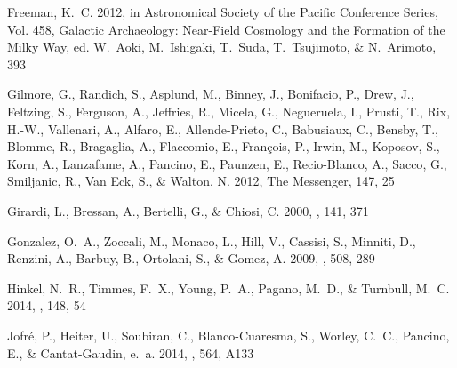 \documentclass[12pt, preprint]{aastex}
\begin{document}
\begin{thebibliography}{24}
{Freeman}, K.~C. 2012, in Astronomical Society of the Pacific Conference
  Series, Vol. 458, Galactic Archaeology: Near-Field Cosmology and the
  Formation of the Milky Way, ed. W.~{Aoki}, M.~{Ishigaki}, T.~{Suda},
  T.~{Tsujimoto}, \& N.~{Arimoto}, 393

{Gilmore}, G., {Randich}, S., {Asplund}, M., {Binney}, J., {Bonifacio}, P.,
  {Drew}, J., {Feltzing}, S., {Ferguson}, A., {Jeffries}, R., {Micela}, G.,
  {Negueruela}, I., {Prusti}, T., {Rix}, H.-W., {Vallenari}, A., {Alfaro}, E.,
  {Allende-Prieto}, C., {Babusiaux}, C., {Bensby}, T., {Blomme}, R.,
  {Bragaglia}, A., {Flaccomio}, E., {Fran{\c c}ois}, P., {Irwin}, M.,
  {Koposov}, S., {Korn}, A., {Lanzafame}, A., {Pancino}, E., {Paunzen}, E.,
  {Recio-Blanco}, A., {Sacco}, G., {Smiljanic}, R., {Van Eck}, S., \& {Walton},
  N. 2012, The Messenger, 147, 25

{Girardi}, L., {Bressan}, A., {Bertelli}, G., \& {Chiosi}, C. 2000, \aaps, 141,
  371

{Gonzalez}, O.~A., {Zoccali}, M., {Monaco}, L., {Hill}, V., {Cassisi}, S.,
  {Minniti}, D., {Renzini}, A., {Barbuy}, B., {Ortolani}, S., \& {Gomez}, A.
  2009, \aap, 508, 289

{Hinkel}, N.~R., {Timmes}, F.~X., {Young}, P.~A., {Pagano}, M.~D., \&
  {Turnbull}, M.~C. 2014, \aj, 148, 54

{Jofr{\'e}}, P., {Heiter}, U., {Soubiran}, C., {Blanco-Cuaresma}, S., {Worley},
  C.~C., {Pancino}, E., \& {Cantat-Gaudin}, e.~a. 2014, \aap, 564, A133


\end{thebibliography}
\end{document}
